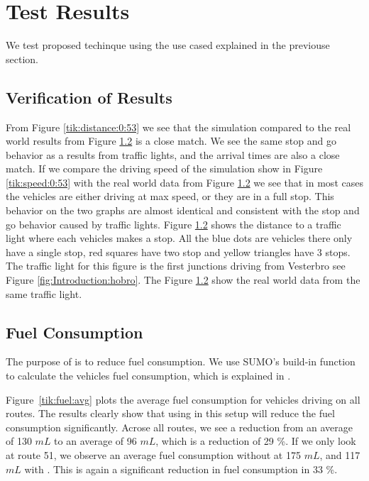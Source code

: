\section{Test Results}
We test proposed techinque using the use cased explained in the previouse section.

\subsection{Verification of Results}

From Figure \ref{tik:distance:0:53} we see that the simulation compared to the real world results from Figure \ref{} is a close match. We see the same stop and go behavior as a results from traffic lights, and the arrival times are also a close match. If we compare the driving speed of the simulation show in Figure \ref{tik:speed:0:53} with the real world data from Figure \ref{} we see that in most cases the vehicles are either driving at max speed, or they are in a full stop. This behavior on the two graphs are almost identical and consistent with the stop and go behavior caused by traffic lights. Figure \ref{} shows the distance to a traffic light where each vehicles makes a stop. All the blue dots are vehicles there only have a single stop, red squares have two stop and yellow triangles have 3 stops. The traffic light for this figure is the first junctions driving from Vesterbro see Figure \ref{fig:Introduction:hobro}. The Figure \ref{} show the real world data from the same traffic light. 



\subsection{Fuel Consumption}
The purpose of \tech is to reduce fuel consumption. 
We use SUMO's build-in function to calculate the vehicles fuel consumption, which is explained in \cite{SUMOFuel}.

Figure~\ref{tik:fuel:avg} plots the average fuel consumption for vehicles driving on all routes. 
The results clearly show that using \tech in this setup will reduce the fuel consumption significantly.
Acrose all routes, we see a reduction from an average of 130 $mL$ to an average of 96 $mL$, which is a reduction of 29 \%.
If we only look at route 51, we observe an average fuel consumption without \tech at 175 $mL$, and 117 $mL$ with \tech.
This is again a significant reduction in fuel consumption in 33 \%.


